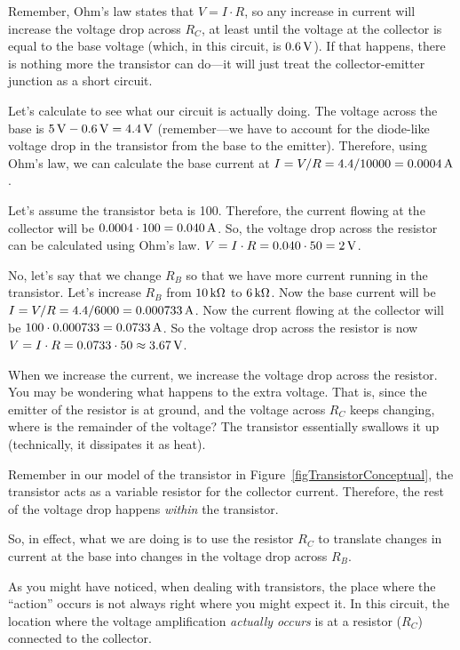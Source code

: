 Remember, Ohm's law states that $V = I\cdot R$, so any increase in current will increase the voltage drop across $R_C$, at least until the voltage at the collector is equal to the base voltage (which, in this circuit, is $0.6\,\si{\volt}$).
If that happens, there is nothing more the transistor can do---it will just treat the collector-emitter junction as a short circuit.

Let's calculate to see what our circuit is actually doing.
The voltage across the base is $5\,\si{\volt} - 0.6\,\si{\volt} = 4.4\,\si{\volt}$ (remember---we have to account for the diode-like voltage drop in the transistor from the base to the emitter).
Therefore, using Ohm's law, we can calculate the base current at $I = V / R = 4.4 / 10000 = 0.0004\,\si{\ampere}$.

Let's assume the transistor beta is 100.
Therefore, the current flowing at the collector will be $0.0004 \cdot 100 = 0.040\,\si{\ampere}$.
So, the voltage drop across the resistor can be calculated using Ohm's law.
$V = I\cdot R = 0.040 \cdot 50 = 2\,\si{\volt}$.

No, let's say that we change $R_B$ so that we have more current running in the transistor.
Let's increase $R_B$ from $10\,\si{\kilo\ohm}$ to $6\,\si{\kilo\ohm}$.
Now the base current will be $I = V / R = 4.4 / 6000 = 0.000733\,\si{\ampere}$.
Now the current flowing at the collector will be $100 \cdot 0.000733 = 0.0733\,\si{\ampere}$.
So the voltage drop across the resistor is now $V = I \cdot R = 0.0733 \cdot 50 \approx 3.67\,\si{\volt}$.

When we increase the current, we increase the voltage drop across the resistor.
You may be wondering what happens to the extra voltage.
That is, since the emitter of the resistor is at ground, and the voltage across $R_C$ keeps changing, where is the remainder of the voltage?
The transistor essentially swallows it up (technically, it dissipates it as heat).

Remember in our model of the transistor in Figure~\ref{figTransistorConceptual}, the transistor acts as a variable resistor for the collector current.
Therefore, the rest of the voltage drop happens \emph{within} the transistor.

So, in effect, what we are doing is to use the resistor $R_C$ to translate changes in current at the base into changes in the voltage drop across $R_B$.

As you might have noticed, when dealing with transistors, the place where the ``action'' occurs is not always right where you might expect it.
In this circuit, the location where the voltage amplification \emph{actually occurs} is at a resistor ($R_C$) connected to the collector.

